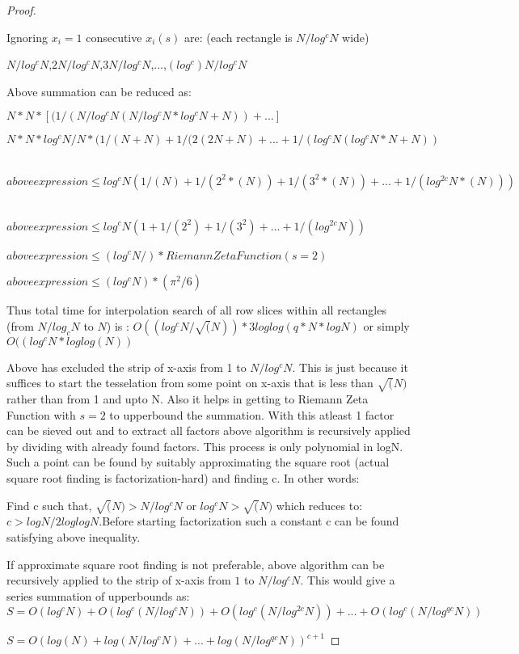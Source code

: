 \documentclass[11pt,onecolumn]{article}
\begin{document}
\begin{proof}
\begin{enumerate}
Ignoring $x_{i}=1$ consecutive $x_{i}(s)$ are: (each rectangle is $N/log^{c}N$ wide)

$N/log^{c}N$,$2N/log^{c}N$,$3N/log^{c}N$,...,$(log^{c})N/log^{c}N$

Above summation can be reduced as:

$N*N*[(1/(N/log^{c}N(N/log^{c}N * log^{c}N + N)) + ...]$

$N*N*log^{c}N/N *(1/(N+N)+1/(2(2N+N)+...+1/(log^{c}N(log^{c}N*N+N))$ \

$aboveexpression \le log^{c}N(1/(N)+1/(2^{2}*(N))+1/(3^{2}*(N))+...+1/(log^{2c}N*(N)))$ \

$aboveexpression \le log^{c}N(1+1/(2^{2})+1/(3^{2})+...+1/(log^{2c}N))$ \

$aboveexpression \le (log^{c}N/)*RiemannZetaFunction(s=2)$ \

$above expression \le (log^{c}N) * (\pi^{2}/6)$

Thus total time for interpolation search of all row  slices within all rectangles (from $N/log_{c}N$ to $N$) is :
$O((log^{c}N/\sqrt(N))*3loglog(q*N*logN)$ or simply $O((log^{c}N*loglog(N))$

\end{enumerate}

Above has excluded the strip of x-axis from 1 to $N/log^{c}N$. This is just because it suffices to start the tesselation from some point on x-axis that is less than $\sqrt(N)$ rather than from 1 and upto N. Also it helps in getting to Riemann Zeta Function with $s=2$ to upperbound the summation. With this atleast 1 factor can be sieved out and to extract all factors above algorithm is recursively applied by dividing with already found factors. This process is only polynomial in logN. Such a point can be found by suitably approximating the square root (actual square root finding is factorization-hard) and finding c. In other words:

Find c such that, $\sqrt(N) > N/log^{c}N$ or $log^{c}N > \sqrt(N)$ which reduces to:
$c > logN/2loglogN$.Before starting factorization such a constant c can be found satisfying above inequality. 


If approximate square root finding is not preferable, above algorithm can be recursively applied to the strip of x-axis from $1$ to $N/log^{c}N$. This would give a series summation of upperbounds as:
$S=O(log^{c}N) +O(log^{c}(N/log^{c}N)) + O(log^{c}(N/log^{2c}N)) +...+O(log^{c}(N/log^{qc}N))$

$S = O(log(N) +log(N/log^{c}N) + ... + log(N/log^{qc}N))^{c+1}$


\end{proof}
\end{document}
